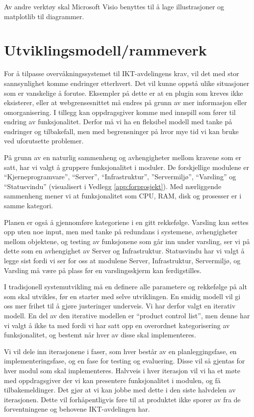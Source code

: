 Av andre verktøy skal Microsoft Visio benyttes til å lage illustrasjoner og matplotlib til diagrammer. 

\section{Utviklingsmodell/rammeverk}
For å tilpasse overvåkningssystemet til IKT-avdelingens krav, vil det med stor sannsynlighet komme endringer etterhvert. Det vil kunne oppstå ulike situasjoner som er vanskelige å forutse. Eksempler på dette er at en plugin som kreves ikke eksisterer, eller at webgrensesnittet må endres på grunn av mer informasjon eller omorganisering. I tillegg kan oppdragsgiver komme med innspill som fører til endring av funksjonalitet. Derfor må vi ha en fleksibel modell med tanke på endringer og tilbakefall, men med begrensninger på hvor mye tid vi kan bruke ved uforutsette problemer.

På grunn av en naturlig sammenheng og avhengigheter mellom kravene som er satt, har vi valgt å gruppere funksjonalitet i moduler. De forskjellige modulene er ``Kjerneprogramvare'', ``Server'', ``Infrastruktur'', ''Servermiljø'', ``Varsling'' og ``Statusvindu'' (visualisert i Vedlegg \ref{app:forprosjekt}). Med nærliggende sammenheng mener vi at funksjonalitet som CPU, RAM, disk og prosesser er i samme kategori. 

Planen er også å gjennomføre kategoriene i en gitt rekkefølge. Varsling kan settes opp uten noe input, men med tanke på redundans i systemene, avhengigheter mellom objektene, og testing av funksjonene som går inn under varsling, ser vi på dette som en avhengighet av Server og Infrastruktur. Statusvindu har vi valgt å legge sist fordi vi ser for oss at modulene Server, Infrastruktur, Servermiljø, og Varsling må være på plass før en varslingsskjerm kan ferdigstilles.

I tradisjonell systemutvikling må en definere alle parametere og rekkefølge på alt som skal utvikles, før en starter med selve utviklingen. En smidig modell vil gi oss mer frihet til å gjøre justeringer underveis. Vi har derfor valgt en iterativ modell\cite{wiki:iterativ}. En del av den iterative modellen er ``product control list'', men denne har vi valgt å ikke ta med fordi vi har satt opp en overordnet kategorisering av funksjonalitet, og bestemt når hver av disse skal implementeres.

Vi vil dele inn iterasjonene i faser, som hver består av en planleggingsfase, en implementeringsfase, og en fase for testing og evaluering. Disse vil så gjentas for hver modul som skal implementeres. Halvveis i hver iterasjon vil vi ha et møte med oppdragsgiver der vi kan presentere funksjonalitet i modulen, og få tilbakemeldinger. Det gjør at vi kan jobbe med dette i den siste halvdelen av iterasjonen. Dette vil forhåpentligvis føre til at produktet ikke sporer av fra de forventningene og behovene IKT-avdelingen har.

